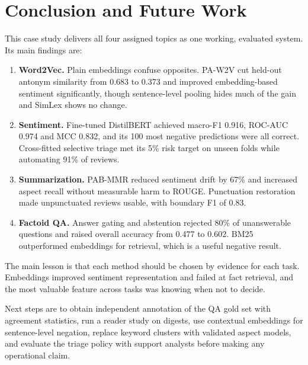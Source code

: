 \documentclass[11pt,a4paper]{article}
\begin{document}
\section{Conclusion and Future Work}
This case study delivers all four assigned topics as one working, evaluated system. Its main findings are:
\begin{enumerate}
\item \textbf{Word2Vec.} Plain embeddings confuse opposites. PA-W2V cut held-out antonym similarity from 0.683 to 0.373 and improved embedding-based sentiment significantly, though sentence-level pooling hides much of the gain and SimLex shows no change.
\item \textbf{Sentiment.} Fine-tuned DistilBERT achieved macro-F1 0.916, ROC-AUC 0.974 and MCC 0.832, and its 100 most negative predictions were all correct. Cross-fitted selective triage met its 5\% risk target on unseen folds while automating 91\% of reviews.
\item \textbf{Summarization.} PAB-MMR reduced sentiment drift by 67\% and increased aspect recall without measurable harm to ROUGE. Punctuation restoration made unpunctuated reviews usable, with boundary F1 of 0.83.
\item \textbf{Factoid QA.} Answer gating and abstention rejected 80\% of unanswerable questions and raised overall accuracy from 0.477 to 0.602. BM25 outperformed embeddings for retrieval, which is a useful negative result.
\end{enumerate}
The main lesson is that each method should be chosen by evidence for each task. Embeddings improved sentiment representation and failed at fact retrieval, and the most valuable feature across tasks was knowing when not to decide.

Next steps are to obtain independent annotation of the QA gold set with agreement statistics, run a reader study on digests, use contextual embeddings for sentence-level negation, replace keyword clusters with validated aspect models, and evaluate the triage policy with support analysts before making any operational claim.
\end{document}
